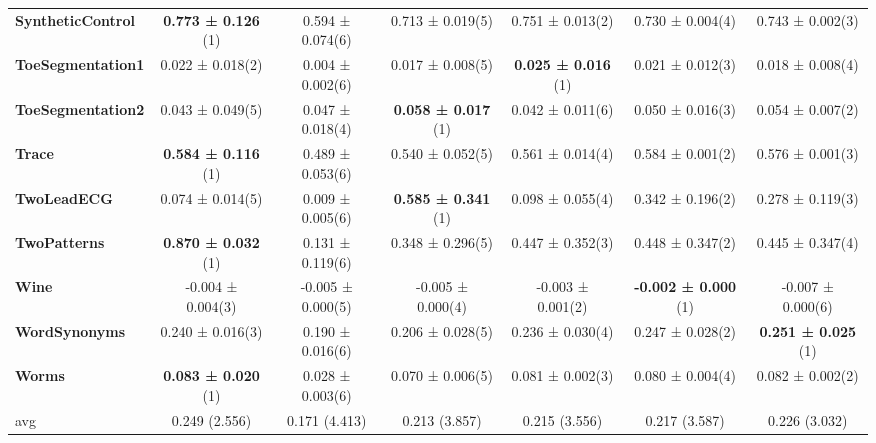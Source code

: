 \begin{table}[ht]
\begin{adjustbox}{width=\textwidth}
\begin{tabular}{lcccccc}
    \textbf{SyntheticControl} & \textbf{0.773 ± 0.126} (1) & 0.594 ± 0.074(6) & 0.713 ± 0.019(5) & 0.751 ± 0.013(2) & 0.730 ± 0.004(4) & 0.743 ± 0.002(3) \\
    \textbf{ToeSegmentation1} & 0.022 ± 0.018(2) & 0.004 ± 0.002(6) & 0.017 ± 0.008(5) & \textbf{0.025 ± 0.016} (1) & 0.021 ± 0.012(3) & 0.018 ± 0.008(4) \\
    \textbf{ToeSegmentation2} & 0.043 ± 0.049(5) & 0.047 ± 0.018(4) & \textbf{0.058 ± 0.017} (1) & 0.042 ± 0.011(6) & 0.050 ± 0.016(3) & 0.054 ± 0.007(2) \\
    \textbf{Trace} & \textbf{0.584 ± 0.116} (1) & 0.489 ± 0.053(6) & 0.540 ± 0.052(5) & 0.561 ± 0.014(4) & 0.584 ± 0.001(2) & 0.576 ± 0.001(3) \\
    \textbf{TwoLeadECG} & 0.074 ± 0.014(5) & 0.009 ± 0.005(6) & \textbf{0.585 ± 0.341} (1) & 0.098 ± 0.055(4) & 0.342 ± 0.196(2) & 0.278 ± 0.119(3) \\
    \textbf{TwoPatterns} & \textbf{0.870 ± 0.032} (1) & 0.131 ± 0.119(6) & 0.348 ± 0.296(5) & 0.447 ± 0.352(3) & 0.448 ± 0.347(2) & 0.445 ± 0.347(4) \\
    \textbf{Wine} & -0.004 ± 0.004(3) & -0.005 ± 0.000(5) & -0.005 ± 0.000(4) & -0.003 ± 0.001(2) & \textbf{-0.002 ± 0.000} (1) & -0.007 ± 0.000(6) \\
    \textbf{WordSynonyms} & 0.240 ± 0.016(3) & 0.190 ± 0.016(6) & 0.206 ± 0.028(5) & 0.236 ± 0.030(4) & 0.247 ± 0.028(2) & \textbf{0.251 ± 0.025} (1) \\
    \textbf{Worms} & \textbf{0.083 ± 0.020} (1) & 0.028 ± 0.003(6) & 0.070 ± 0.006(5) & 0.081 ± 0.002(3) & 0.080 ± 0.004(4) & 0.082 ± 0.002(2) \\
    \hline 
    avg & 0.249 (2.556) & 0.171 (4.413) & 0.213 (3.857) & 0.215 (3.556) & 0.217 (3.587) & 0.226 (3.032) \\ 
    \hline
    \end{tabular}
    \end{adjustbox}
    \end{table}

